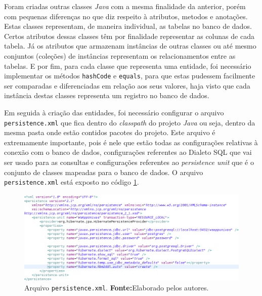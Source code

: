 		\pagebreak
		
		\par Foram criadas outras classes \textit{Java} com a mesma finalidade da
	anterior, porém com pequenas diferenças no que diz respeito à atributos,
	metodos e anotações. Estas classes representam, de maneira individual, as
	tabelas no banco de dados. Certos atributos dessas classes têm por finalidade
	representar as colunas de cada tabela. Já os atributos que armazenam instâncias
	de outras classes ou até mesmo conjuntos (coleções) de instâncias representam os
	relacionamentos entre as tabelas. E por fim, para cada classe que representa uma
	entidade, foi necessário implementar os métodos \texttt{hashCode} e
	\texttt{equals}, para que estas pudessem facilmente ser comparadas e
	diferenciadas em relação aos seus valores, haja visto que cada instância
	destas classes representa um registro no banco de dados.
		
		\par Em seguida à criação das entidades, foi necessário configurar o arquivo
	\texttt{persistence.xml} que fica dentro do \textit{classpath} do projeto
	\textit{Java} ou seja, dentro da mesma pasta onde estão contidos pacotes do
	projeto. Este arquivo é extremamente importante, pois é nele que estão todas
	as configurações relativas à conexão com o banco de dados, configurações
	referentes ao Dialeto SQL que vai ser usado para as consultas e configurações
	referentes ao \textit{persistence unit} que é o conjunto de classes mapeadas
	para o banco de dados.	O arquivo \texttt{persistence.xml} está exposto no
	código \ref{fig:qm11}.
	
 		\begin{figure}[h!]
			\centerline{\includegraphics[scale=0.6]{./imagens/2_q_metodologico/qm11.png}}
			\caption[Arquivo \texttt{persistence.xml}]{Arquivo \texttt{persistence.xml}.
			\textbf{Fonte:}Elaborado pelos autores.}
			\label{fig:qm11}
		\end{figure}
		
